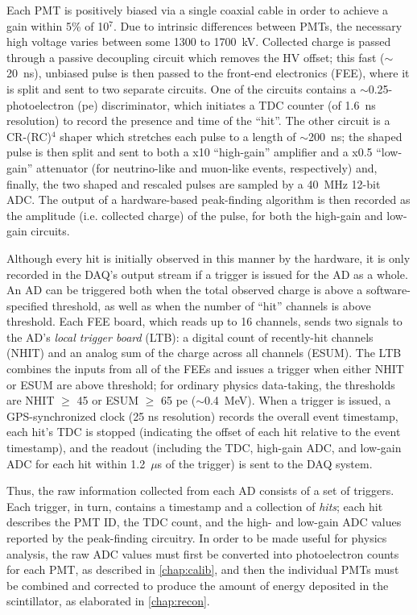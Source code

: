 \documentclass[../thesis.tex]{subfiles}
\begin{document}
Each PMT is positively biased via a single coaxial cable in order to achieve a gain within 5\% of 10$^7$. Due to intrinsic differences between PMTs, the necessary high voltage varies between some 1300 to 1700~kV. Collected charge is passed through a passive decoupling circuit which removes the HV offset; this fast ($\sim$20~ns), unbiased pulse is then passed to the front-end electronics (FEE), where it is split and sent to two separate circuits. One of the circuits contains a $\sim$0.25-photoelectron (pe) discriminator, which initiates a TDC counter (of 1.6~ns resolution) to record the presence and time of the ``hit''. The other circuit is a CR-(RC)$^4$ shaper which stretches each pulse to a length of $\sim$200~ns; the shaped pulse is then split and sent to both a x10 ``high-gain'' amplifier and a x0.5 ``low-gain'' attenuator (for neutrino-like and muon-like events, respectively) and, finally, the two shaped and rescaled pulses are sampled by a 40~MHz 12-bit ADC. The output of a hardware-based peak-finding algorithm is then recorded as the amplitude (i.e. collected charge) of the pulse, for both the high-gain and low-gain circuits.

Although every hit is initially observed in this manner by the hardware, it is only recorded in the DAQ's output stream if a trigger is issued for the AD as a whole. An AD can be triggered both when the total observed charge is above a software-specified threshold, as well as when the number of ``hit'' channels is above threshold. Each FEE board, which reads up to 16 channels, sends two signals to the AD's \emph{local trigger board} (LTB): a digital count of recently-hit channels (NHIT) and an analog sum of the charge across all channels (ESUM). The LTB combines the inputs from all of the FEEs and issues a trigger when either NHIT or ESUM are above threshold; for ordinary physics data-taking, the thresholds are NHIT $\geq$ 45 or ESUM $\geq$ 65 pe ($\sim$0.4~MeV). When a trigger is issued, a GPS-synchronized clock (25 ns resolution) records the overall event timestamp, each hit's TDC is stopped (indicating the offset of each hit relative to the event timestamp), and the readout (including the TDC, high-gain ADC, and low-gain ADC for each hit within 1.2~$\mu$s of the trigger) is sent to the DAQ system.

Thus, the raw information collected from each AD consists of a set of triggers. Each trigger, in turn, contains a timestamp and a collection of \emph{hits}; each hit describes the PMT ID, the TDC count, and the high- and low-gain ADC values reported by the peak-finding circuitry. In order to be made useful for physics analysis, the raw ADC values must first be converted into photoelectron counts for each PMT, as described in \autoref{chap:calib}, and then the individual PMTs must be combined and corrected to produce the amount of energy deposited in the scintillator, as elaborated in \autoref{chap:recon}.
\end{document}
